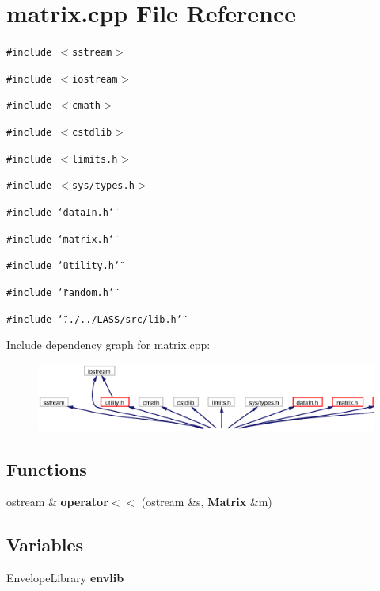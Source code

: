 \section{matrix.cpp File Reference}
\label{matrix_8cpp}
{\tt \#include $<$sstream$>$}\par
{\tt \#include $<$iostream$>$}\par
{\tt \#include $<$cmath$>$}\par
{\tt \#include $<$cstdlib$>$}\par
{\tt \#include $<$limits.h$>$}\par
{\tt \#include $<$sys/types.h$>$}\par
{\tt \#include \char`\"{}data\-In.h\char`\"{}}\par
{\tt \#include \char`\"{}matrix.h\char`\"{}}\par
{\tt \#include \char`\"{}utility.h\char`\"{}}\par
{\tt \#include \char`\"{}random.h\char`\"{}}\par
{\tt \#include \char`\"{}../../LASS/src/lib.h\char`\"{}}\par


Include dependency graph for matrix.cpp:\begin{figure}[H]
\begin{center}
\leavevmode
\includegraphics[width=380pt]{matrix_8cpp__incl}
\end{center}
\end{figure}
\subsection*{Functions}
\begin{CompactItemize}
\item 
ostream \& {\bf operator$<$$<$} (ostream \&s, {\bf Matrix} \&m)
\end{CompactItemize}
\subsection*{Variables}
\begin{CompactItemize}
\item 
Envelope\-Library {\bf envlib}
\end{CompactItemize}


